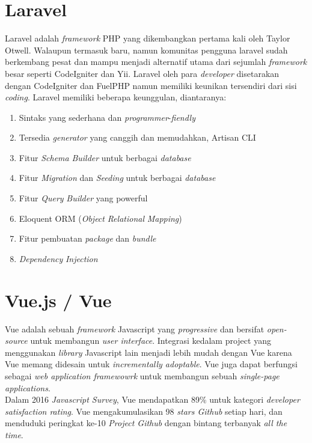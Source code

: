        
   \section{Laravel}
   Laravel adalah \textit{framework} PHP yang dikembangkan pertama kali oleh Taylor Otwell. Walaupun termasuk baru, namun komunitas pengguna laravel sudah berkembang pesat dan mampu menjadi alternatif utama dari sejumlah \textit{framework} besar seperti CodeIgniter dan Yii. Laravel oleh para \textit{developer} disetarakan dengan CodeIgniter dan FuelPHP namun memiliki keunikan tersendiri dari sisi \textit{coding}. Laravel memiliki beberapa keunggulan, diantaranya:
   \begin{enumerate}
      	\item Sintaks yang sederhana dan \textit{programmer}-\textit{fiendly}
      	\item Tersedia \textit{generator} yang canggih dan memudahkan, Artisan CLI
      	\item Fitur \textit{Schema} \textit{Builder} untuk berbagai \textit{database}
      	\item Fitur \textit{Migration} dan \textit{Seeding} untuk berbagai \textit{database}
      	\item Fitur \textit{Query} \textit{Builder} yang powerful
      	\item Eloquent ORM (\textit{Object} \textit{Relational} \textit{Mapping})
      	\item Fitur pembuatan \textit{package} dan \textit{bundle}
      	\item \textit{Dependency} \textit{Injection} \cite{noauthor_apa_2016}
   \end{enumerate}
   
   \section{Vue.js / Vue}
   Vue adalah sebuah \textit{framework} Javascript yang \textit{progressive} dan bersifat \textit{open-source} untuk membangun \textit{user interface}. Integrasi kedalam project yang menggunakan \textit{library } Javascript lain menjadi lebih mudah dengan Vue karena Vue memang didesain untuk \textit{incrementally adoptable}. Vue juga dapat berfungsi sebagai \textit{web application framewowrk} untuk membangun sebuah \textit{single-page applications}.
   \\ \indent
   Dalam 2016 \textit{Javascript Survey}, Vue mendapatkan 89\% untuk kategori \textit{developer satisfaction rating}. Vue mengakumulasikan 98 \textit{stars Github} setiap hari, dan menduduki peringkat ke-10 \textit{Project Github} dengan bintang terbanyak \textit{all the time}\cite{wikipedia_vue.js_2017}.
          
